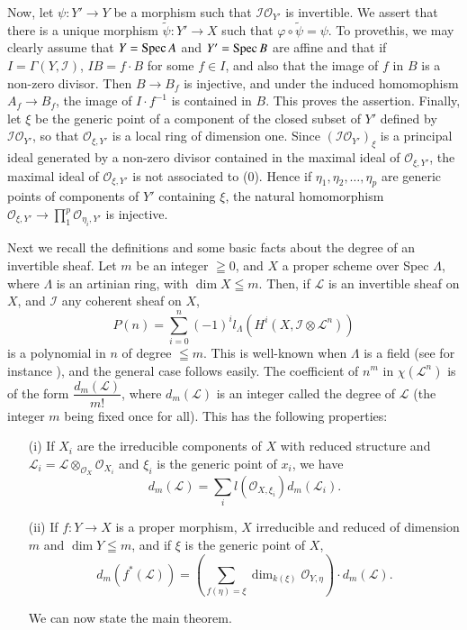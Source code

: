 Now, let $\psi:Y' \to Y$ be a morphism such that $\mathscr{I} \mathscr{O}_{Y'}$ is invertible. We assert that there is a unique morphism $\tilde{\psi} : Y' \to X$ such that $\varphi \circ \tilde{\psi} = \psi$. To prove\pageoriginale this, we may clearly assume that $Y = \operatorname{Spec} A $ and $Y' = \operatorname{Spec} B$ are affine and that if $I = \Gamma (Y, \mathscr{I})$, $IB = f \cdot B$ for some $f \in I$, and also that the image of $f$ in $B$ is a non-zero divisor. Then $B \to B_f$ is injective, and under the induced homomophism $A_f \to B_f$, the image of $I \cdot f^{-1}$ is contained in $B$. This proves the assertion. Finally, let $\xi$ be the generic point of a component of the closed subset of $Y'$ defined by $\mathscr{I} \mathscr{O}_{Y'}$, so that $\mathscr{O}_{\xi, Y'}$ is a local ring of dimension one. Since $(\mathscr{I} \mathscr{O}_{Y'})_{\xi}$ is a principal ideal generated by a non-zero divisor contained in the  maximal ideal of $\mathscr{O}_{\xi, Y'}$, the maximal ideal of $\mathscr{O}_{\xi, Y'}$ is not associated to (0). Hence if $\eta_1, \eta_2, \ldots, \eta_p $ are generic points of components of $Y'$ containing $\xi$, the natural homomorphism $\mathscr{O}_{\xi, Y'} \to \prod\limits^{p}_1 \mathscr{O}_{\eta_i, Y'}$ is injective.

Next we recall the definitions and some basic facts about the degree of an invertible sheaf. Let $m$ be an integer $\geqq 0$, and $X$ a proper scheme over Spec $\Lambda$, where $\Lambda$ is an artinian ring, with $\dim X \leqq m$. Then, if $\mathscr{L}$ is an invertible sheaf on $X$, and $\mathscr{I}$ any coherent sheaf on $X$,
$$
P(n) = \sum\limits^{n}_{i=0} (-1)^i l_\Lambda (H^i (X, \mathscr{I} \otimes \mathscr{L}^n))
$$
is a polynomial in $n$ of degree $\leqq m$. This is well-known when $\Lambda$ is a field (see for instance \cite{art11-key2}), and the general case follows easily. The coefficient of $n^m$ in $\chi (\mathscr{L}^n)$ is of the form $\dfrac{d_m (\mathscr{L})}{m!}$, where $d_m (\mathscr{L})$ is an integer called the degree of $\mathscr{L}$ (the integer $m$ being fixed once for all). This has the following properties:
\begin{itemize}
\item[(i)] If $X_i$ are the irreducible components of $X$ with reduced structure and $\mathscr{L}_i = \mathscr{L} \otimes_{\mathscr{O}_X} \mathscr{O}_{X_i}$ and $\xi_i$ is the generic point of $x_i$, we have
$$
d_m (\mathscr{L}) = \sum\limits_i l(\mathscr{O}_{X, \xi_i}) d_m (\mathscr{L}_i).
$$

\item[(ii)] If $f: Y \to X$ is a proper morphism, $X$ irreducible and reduced of dimension $m$ and $\dim Y \leqq m$, and if $\xi$ is the generic point of $X$,
$$
d_m (f^* (\mathscr{L})) = (\sum\limits_{f (\eta) =\xi} \dim _{k(\xi)} \mathscr{O}_{Y,\eta}) \cdot d_m (\mathscr{L}).
$$

We can now state the main theorem.
\end{itemize}

